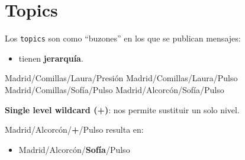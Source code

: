 \documentclass[xcolor={x11names}]{beamer}
\begin{document}
\section{Topics}
\begin{frame}{\secname}
    Los \texttt{topics} son como ``buzones''
    en los que se publican mensajes:
    \begin{itemize}
        \item tienen \textbf{jerarquía}.
    \end{itemize}

    \vspace{1em}

    \begin{minipage}{.5\textwidth} %
        {\color{Firebrick3}Madrid}/{\color{Gold3}Comillas}/{\color{DodgerBlue3}Laura}/{\color{OliveDrab4}Presión}
        {\color{Firebrick3}Madrid}/{\color{Gold3}Comillas}/{\color{DodgerBlue3}Laura}/{\color{OliveDrab4}Pulso}
        {\color{Firebrick3}Madrid}/{\color{Gold3}Comillas}/{\color{DodgerBlue3}Sofía}/{\color{OliveDrab4}Pulso}
        {\color{Firebrick3}Madrid}/{\color{Gold3}Alcorcón}/{\color{DodgerBlue3}Sofía}/{\color{OliveDrab4}Pulso}
    \end{minipage}
    \begin{minipage}{.45\textwidth} %
        \begin{figure}
            
        \end{figure}
    \end{minipage}
\end{frame}




\begin{frame}{\secname}
    \textbf{Single level wildcard (+)}:
    nos permite sustituir un solo nivel.

    \vspace{1em}

    
    \begin{minipage}{.51\textwidth} %
        {\color{Firebrick3}Madrid}/{\color{Gold3}Alcorcón}/{\color{DodgerBlue3}\textbf{+}}/{\color{OliveDrab4}Pulso} resulta en:

        \begin{itemize}
            \item {\color{Firebrick3}Madrid}/{\color{Gold3}Alcorcón}/{\color{DodgerBlue3}\textbf{Sofía}}/{\color{OliveDrab4}Pulso}
        \end{itemize}
    \end{minipage}
    \begin{minipage}{.4\textwidth} %
        \begin{figure}
            
        \end{figure}
    \end{minipage}
\end{frame}
\end{document}

